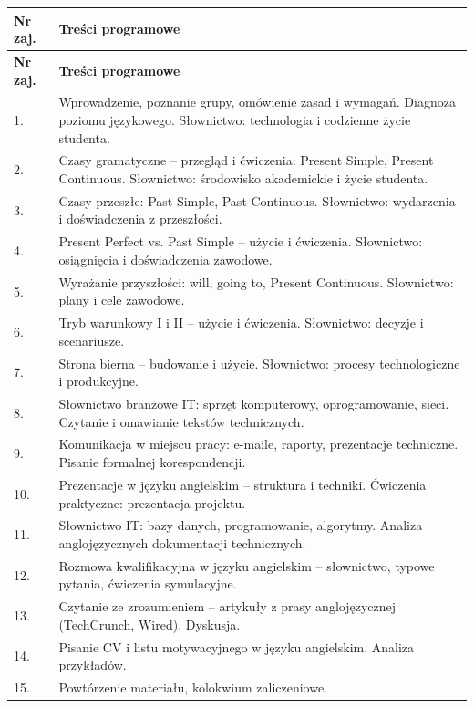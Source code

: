 \documentclass[12pt, a4paper]{article}
\newcommand{\thdrule}{\noalign{\global\setlength{\extrarowheight}{0pt}}}
\newcommand{\thdend}{\noalign{\global\setlength{\extrarowheight}{3pt}}}
\begin{document}
{\scriptsize
\begin{longtable}{m{1.5cm}m{14.5cm}}
\thdrule\toprule
\rowcolor{pjatkRed} {\color{white}\textbf{Nr zaj.}} & {\color{white}\textbf{Treści programowe}} \\
\midrule\thdend
\endfirsthead
\thdrule\toprule
\rowcolor{pjatkRed} {\color{white}\textbf{Nr zaj.}} & {\color{white}\textbf{Treści programowe}} \\
\midrule\thdend
\endhead
  \rowcolor{tableRowLight} 1. & Wprowadzenie, poznanie grupy, omówienie zasad i wymagań. Diagnoza poziomu językowego. Słownictwo: technologia i codzienne życie studenta. \\
  \rowcolor{tableRowAlt} 2. & Czasy gramatyczne – przegląd i ćwiczenia: Present Simple, Present Continuous. Słownictwo: środowisko akademickie i życie studenta. \\
  \rowcolor{tableRowLight} 3. & Czasy przeszłe: Past Simple, Past Continuous. Słownictwo: wydarzenia i doświadczenia z przeszłości. \\
  \rowcolor{tableRowAlt} 4. & Present Perfect vs. Past Simple – użycie i ćwiczenia. Słownictwo: osiągnięcia i doświadczenia zawodowe. \\
  \rowcolor{tableRowLight} 5. & Wyrażanie przyszłości: will, going to, Present Continuous. Słownictwo: plany i cele zawodowe. \\
  \rowcolor{tableRowAlt} 6. & Tryb warunkowy I i II – użycie i ćwiczenia. Słownictwo: decyzje i scenariusze. \\
  \rowcolor{tableRowLight} 7. & Strona bierna – budowanie i użycie. Słownictwo: procesy technologiczne i produkcyjne. \\
  \rowcolor{tableRowAlt} 8. & Słownictwo branżowe IT: sprzęt komputerowy, oprogramowanie, sieci. Czytanie i omawianie tekstów technicznych. \\
  \rowcolor{tableRowLight} 9. & Komunikacja w miejscu pracy: e-maile, raporty, prezentacje techniczne. Pisanie formalnej korespondencji. \\
  \rowcolor{tableRowAlt} 10. & Prezentacje w języku angielskim – struktura i techniki. Ćwiczenia praktyczne: prezentacja projektu. \\
  \rowcolor{tableRowLight} 11. & Słownictwo IT: bazy danych, programowanie, algorytmy. Analiza anglojęzycznych dokumentacji technicznych. \\
  \rowcolor{tableRowAlt} 12. & Rozmowa kwalifikacyjna w języku angielskim – słownictwo, typowe pytania, ćwiczenia symulacyjne. \\
  \rowcolor{tableRowLight} 13. & Czytanie ze zrozumieniem – artykuły z prasy anglojęzycznej (TechCrunch, Wired). Dyskusja. \\
  \rowcolor{tableRowAlt} 14. & Pisanie CV i listu motywacyjnego w języku angielskim. Analiza przykładów. \\
  \rowcolor{tableRowLight} 15. & Powtórzenie materiału, kolokwium zaliczeniowe. \\
\bottomrule
\end{longtable}}
\end{document}
